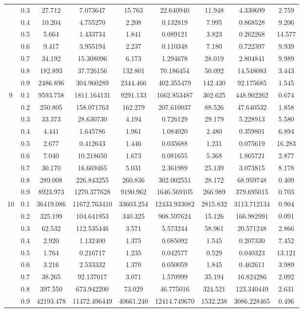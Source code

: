 \begin{longtable}{ | c | c || c | c | c | c | c | c | c | }
 & 0.3 & 27.712 & 7.073647 & 15.763 & 22.640940 & 11.948 & 4.330699 & 2.759 \\
 & 0.4 & 10.204 & 4.755270 & 2.208 & 0.132819 & 7.995 & 0.868528 & 9.206 \\
 & 0.5 & 5.664 & 1.433734 & 1.841 & 0.089121 & 3.823 & 0.262268 & 14.577 \\
 & 0.6 & 9.417 & 3.955194 & 2.237 & 0.110348 & 7.180 & 0.722397 & 9.939 \\
 & 0.7 & 34.192 & 15.308096 & 6.173 & 1.294678 & 28.019 & 2.804841 & 9.989 \\
 & 0.8 & 182.893 & 37.726156 & 132.801 & 70.186454 & 50.092 & 14.548083 & 3.443 \\
 & 0.9 & 2486.896 & 304.960289 & 2344.466 & 402.355479 & 142.430 & 92.175685 & 1.545 \\
 \hline
\multirow{9}{*}{9} & 0.1 & 9593.758 & 1811.164131 & 9291.133 & 1662.853487 & 302.625 & 448.902262 & 0.674 \\
 & 0.2 & 250.805 & 158.071763 & 162.279 & 207.610037 & 88.526 & 47.640532 & 1.858 \\
 & 0.3 & 33.373 & 28.630730 & 4.194 & 0.726129 & 29.179 & 5.228913 & 5.580 \\
 & 0.4 & 4.441 & 1.645786 & 1.961 & 1.084020 & 2.480 & 0.359801 & 6.894 \\
 & 0.5 & 2.677 & 0.412643 & 1.446 & 0.035688 & 1.231 & 0.075619 & 16.283 \\
 & 0.6 & 7.040 & 10.218650 & 1.673 & 0.081655 & 5.368 & 1.865721 & 2.877 \\
 & 0.7 & 30.170 & 16.669465 & 5.031 & 2.361989 & 25.139 & 3.073815 & 8.178 \\
 & 0.8 & 289.008 & 226.843255 & 260.836 & 302.002551 & 28.172 & 68.959748 & 0.409 \\
 & 0.9 & 8923.973 & 1270.377628 & 9190.962 & 1646.569105 & 266.989 & 379.695015 & 0.703 \\
 \hline
\multirow{9}{*}{10} & 0.1 & 36419.086 & 11672.763410 & 33603.254 & 12433.933082 & 2815.832 & 3113.712134 & 0.904 \\
 & 0.2 & 325.199 & 104.641953 & 340.325 & 908.597624 & 15.126 & 166.982991 & 0.091 \\
 & 0.3 & 62.532 & 112.535446 & 3.571 & 5.573244 & 58.961 & 20.571248 & 2.866 \\
 & 0.4 & 2.920 & 1.132400 & 1.375 & 0.085092 & 1.545 & 0.207330 & 7.452 \\
 & 0.5 & 1.764 & 0.216717 & 1.235 & 0.042577 & 0.529 & 0.040323 & 13.121 \\
 & 0.6 & 3.216 & 2.533332 & 1.370 & 0.050059 & 1.845 & 0.462611 & 3.989 \\
 & 0.7 & 38.265 & 92.137017 & 3.071 & 1.570999 & 35.194 & 16.824286 & 2.092 \\
 & 0.8 & 397.550 & 673.942200 & 73.029 & 46.775016 & 324.521 & 123.340449 & 2.631 \\
 & 0.9 & 42193.478 & 11472.496449 & 40661.240 & 12414.749670 & 1532.238 & 3086.228465 & 0.496 \\
 \hline
\hline
\end{longtable}
 
